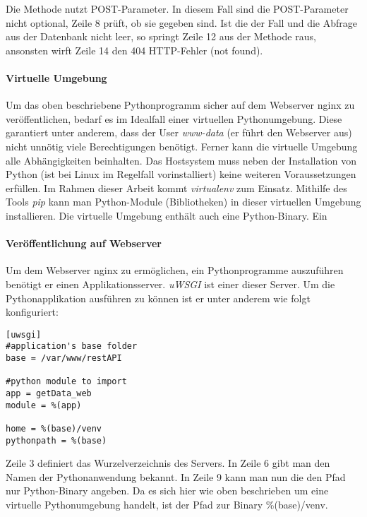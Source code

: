 Die Methode nutzt POST-Parameter. In diesem Fall sind die POST-Parameter nicht optional, Zeile 8 prüft, ob sie gegeben sind. Ist die der Fall und die Abfrage aus der Datenbank nicht leer, so springt Zeile 12 aus der Methode raus, ansonsten wirft Zeile 14 den 404 HTTP-Fehler (not found). 

\paragraph{Virtuelle Umgebung}
Um das oben beschriebene Pythonprogramm sicher auf dem Webserver nginx zu veröffentlichen, bedarf es im Idealfall einer virtuellen Pythonumgebung. Diese garantiert unter anderem, dass der User \textit{www-data} (er führt den Webserver aus) nicht unnötig viele Berechtigungen benötigt. Ferner kann die virtuelle Umgebung alle Abhängigkeiten beinhalten. Das Hostsystem muss neben der Installation von Python (ist bei Linux im Regelfall vorinstalliert) keine weiteren Voraussetzungen erfüllen. Im Rahmen dieser Arbeit kommt \textit{virtualenv} zum Einsatz. Mithilfe des Tools \textit{pip} kann man Python-Module (Bibliotheken) in dieser virtuellen Umgebung installieren. Die virtuelle Umgebung enthält auch eine Python-Binary. Ein    

\paragraph{Veröffentlichung auf Webserver}
Um dem Webserver nginx zu ermöglichen, ein Pythonprogramme auszuführen benötigt er einen Applikationsserver. \textit{uWSGI} ist einer dieser Server. Um die Pythonapplikation ausführen zu können ist er unter anderem wie folgt konfiguriert:
\lstset{language=bash, numbers=left, breaklines=true}
\begin{lstlisting}
[uwsgi]
#application's base folder
base = /var/www/restAPI

#python module to import
app = getData_web
module = %(app)

home = %(base)/venv
pythonpath = %(base)
\end{lstlisting}
Zeile 3 definiert das Wurzelverzeichnis des Servers. In Zeile 6 gibt man den Namen der Pythonanwendung bekannt. In Zeile 9 kann man nun die den Pfad nur Python-Binary angeben. Da es sich hier wie oben beschrieben um eine virtuelle Pythonumgebung handelt, ist der Pfad zur Binary \%(base)/venv.